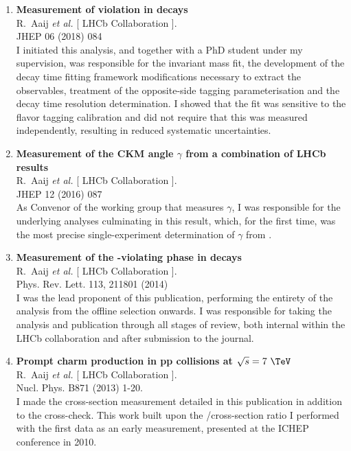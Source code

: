 \begin{enumerate}
     \setlength\itemsep{1ex}

          \item {\bf{ Measurement of \CP violation in \HepProcess{\PBz\to\PDmp\Ppipm} decays }} \\%
                {R.~Aaij {\it et al.} [ LHCb Collaboration ].}      \\%
                JHEP 06 (2018) 084 \\
                       I initiated this analysis, and together with a PhD student under my supervision, was responsible for the \HepProcess{\PBz} invariant mass fit, the development of the decay time fitting framework modifications necessary to extract the \CP observables, treatment of the opposite-side tagging parameterisation and the decay time resolution determination. I showed that the fit was sensitive to the flavor tagging calibration and did not require that this was measured independently, resulting in reduced systematic uncertainties.

        \item {\bf{Measurement of the CKM angle $\gamma$ from a combination of LHCb results}} \\%
                                   {R.~Aaij {\it et al.} [ LHCb Collaboration ].}      \\%
                  JHEP 12 (2016) 087 \\
            As Convenor of the \LHCb working group that measures $\gamma$, I was responsible for the underlying analyses culminating in this result, which, for the first time, was the most precise single-experiment determination of $\gamma$ from \LHCb.
        
    \item {\bf{Measurement of the \CP-violating phase \phis in \BsToDsDs decays}} \\%
            {R.~Aaij {\it et al.} [ LHCb Collaboration ].} \\%
            Phys. Rev. Lett. 113, 211801 (2014)\\
            I was the lead proponent of this publication, performing the entirety of the analysis from the offline selection onwards.
            I was responsible for taking the analysis and publication through all stages of review, both internal within the LHCb collaboration and after submission to the journal.

    \item {\bf{Prompt charm production in pp collisions at $\sqrt{s}= 7~\TeV$}}         \\%
    {R.~Aaij {\it et al.} [ LHCb Collaboration ].}      \\%
    Nucl. Phys. B871 (2013) 1-20.\\
     I made the \HepProcess{\PDspm} cross-section measurement detailed in this publication in addition to the \PDpm cross-check. This work built upon the \PDspm/\PDpm cross-section ratio I performed with the first \LHCb data as an early measurement, presented at the ICHEP conference in 2010.


\end{enumerate}
